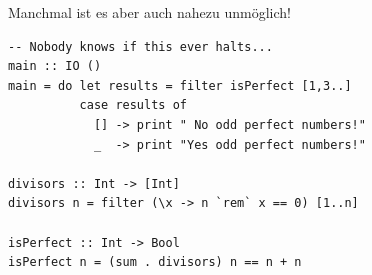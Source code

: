 \documentclass[aspectratio=43]{beamer}
\begin{document}

\begin{frame}[fragile]

Manchmal ist es aber auch nahezu unmöglich!

\begin{framed}
\begin{verbatim}
-- Nobody knows if this ever halts...
main :: IO ()
main = do let results = filter isPerfect [1,3..]
          case results of
            [] -> print " No odd perfect numbers!"
            _  -> print "Yes odd perfect numbers!"

divisors :: Int -> [Int]
divisors n = filter (\x -> n `rem` x == 0) [1..n]

isPerfect :: Int -> Bool
isPerfect n = (sum . divisors) n == n + n
\end{verbatim}
\end{framed}


\end{frame}


\end{document}
